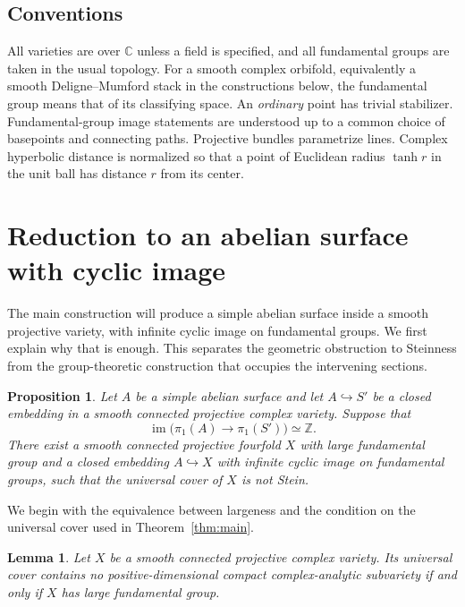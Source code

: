 \documentclass[11pt,reqno]{amsart}
\numberwithin{equation}{section}
\newtheorem{lemma}[theorem]{Lemma}
\newtheorem{proposition}[theorem]{Proposition}
\theoremstyle{definition}
\theoremstyle{remark}
\newcommand{\C}{\mathbb C}
\newcommand{\Z}{\mathbb Z}
\DeclareMathOperator{\im}{im}
\begin{document}
\subsection{Conventions}
All varieties are over $\C$ unless a field is specified, and all
fundamental groups are taken in the usual topology.  For a smooth
complex orbifold, equivalently a smooth Deligne--Mumford stack in the
constructions below, the fundamental group means that of its
classifying space.  An \emph{ordinary} point has trivial stabilizer.
Fundamental-group image statements are understood up to a common
choice of basepoints and connecting paths.  Projective bundles
parametrize lines.  Complex hyperbolic distance is normalized so that
a point of Euclidean radius $\tanh r$ in the unit ball has distance
$r$ from its center.

\section{Reduction to an abelian surface with cyclic image}
\label{sec:reduction}

The main construction will produce a simple abelian surface inside a
smooth projective variety, with infinite cyclic image on fundamental
groups.  We first explain why that is enough.  This separates the
geometric obstruction to Steinness from the group-theoretic construction
that occupies the intervening sections.

\begin{proposition}\label{prop:large-reduction}
Let $A$ be a simple abelian surface and let $A\hookrightarrow S'$ be a
closed embedding in a smooth connected projective complex variety.
Suppose that
\[
 \im\bigl(\pi_1(A)\longrightarrow\pi_1(S')\bigr)\simeq\Z.
\]
There exist a smooth connected projective fourfold $X$ with large
fundamental group and a closed embedding $A\hookrightarrow X$ with
infinite cyclic image on fundamental groups, such that the universal
cover of $X$ is not Stein.
\end{proposition}

We begin with the equivalence between largeness and the condition on
the universal cover used in Theorem~\ref{thm:main}.

\begin{lemma}\label{red:compact-criterion}
Let $X$ be a smooth connected projective complex variety.  Its universal
cover contains no positive-dimensional compact complex-analytic
subvariety if and only if $X$ has large fundamental group.
\end{lemma}
\end{document}
